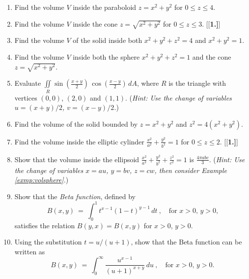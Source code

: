 \startexercises\label{sec3dot5}
\begin{enumerate}[\bfseries 1.]
 \item Find the volume $V$ inside the paraboloid $z=x^2 + y^2$ for $0 \le z \le 4$.
 \item Find the volume $V$ inside the cone $z=\sqrt{x^2 + y^2}$ for $0 \le z \le 3$.
[{[\bfseries 1.]}]
 \item Find the volume $V$ of the solid inside both $x^2 + y^2 + z^2 = 4$ and $x^2 + y^2 = 1$.
 \item Find the volume $V$ inside both the sphere $x^2 + y^2 + z^2 = 1$ and the cone $z=\sqrt{x^2 + y^2}$.
 \item Evaluate $\iint\limits_{R} \sin \left( \frac{x+y}{2} \right)\,\cos \left( \frac{x-y}{2} \right)\,dA$, where $R$
  is the triangle with vertices $(0,0)$, $(2,0)$ and $(1,1)$. (\emph{Hint: Use the change of variables
  $u=(x+y)/2$, $v=(x-y)/2$.})
 \item Find the volume of the solid bounded by $z=x^2 + y^2$ and $z^2 = 4(x^2 + y^2 )$.
 \item Find the volume inside the elliptic cylinder $\frac{x^2}{a^2} + \frac{y^2}{b^2} = 1$ for $0\le z\le 2$.
[{[\bfseries 1.]}]
 \item Show that the volume inside the ellipsoid $\frac{x^2}{a^2} + \frac{y^2}{b^2} + \frac{z^2}{c^2} = 1$ is
  $\tfrac{4\pi abc}{3}$. (\emph{Hint: Use the change of variables $x=au$, $y=bv$, $z=cw$, then consider Example
  \ref{exmp:volsphere}.})
 \item Show that the \emph{Beta function}, defined by
  \begin{displaymath}
   B(x,y) ~=~ \int_0^1 t^{x-1} (1-t)^{y-1} \,dt ~,\quad\text{for $x > 0$, $y > 0$,}
  \end{displaymath}
  satisfies the relation $B(y,x)=B(x,y)$ for $x > 0$, $y > 0$.
 \item Using the substitution $t=u/(u+1)$, show that the Beta function can be written as
  \begin{displaymath}
   B(x,y) ~=~ \int_0^{\infty} \frac{u^{x-1}}{(u+1)^{x+y}}\,du ~,\quad\text{for $x > 0$, $y > 0$.}
  \end{displaymath}
\end{enumerate}
\newpage
